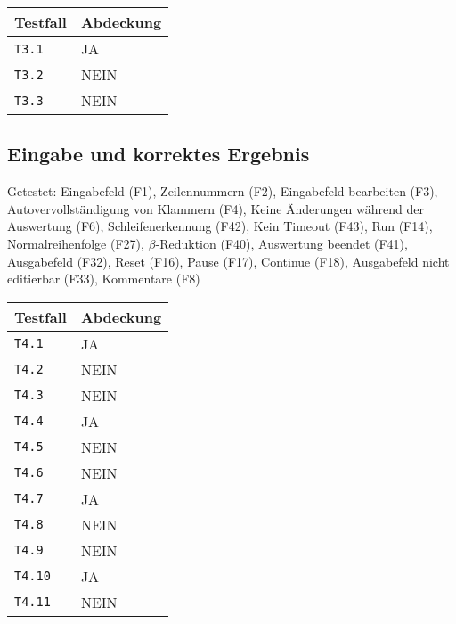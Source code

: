 \documentclass[parskip=full,11pt,twoside]{scrartcl}
\begin{document}
	\label{shortcuts}
	\begin{center}
		\begin{tabular}{ p{9cm} p{4cm}}
    			Testfall & Abdeckung \\ \hline
    			\texttt{T3.1} & \cellcolor{green!20}JA \\ \hline
    			\texttt{T3.2} & \cellcolor{red!20}NEIN \\ \hline
			\texttt{T3.3} & \cellcolor{red!20}NEIN \\ \hline
		\end{tabular}
	\end{center}
	
		\subsection{Eingabe und korrektes Ergebnis}
    Getestet: Eingabefeld (F1), Zeilennummern (F2), Eingabefeld bearbeiten (F3), Autovervollständigung von Klammern (F4), Keine Änderungen während der Auswertung (F6), Schleifenerkennung (F42), Kein Timeout (F43), Run (F14), Normalreihenfolge (F27), $\beta$-Reduktion (F40), Auswertung beendet (F41), Ausgabefeld (F32), Reset (F16), Pause (F17), Continue (F18), Ausgabefeld nicht editierbar (F33), Kommentare (F8)
	\label{shortcuts}
	\begin{center}
		\begin{tabular}{ p{9cm} p{4cm}}
    			Testfall & Abdeckung \\ \hline
    			\texttt{T4.1} & \cellcolor{green!20}JA \\ \hline
    			\texttt{T4.2} & \cellcolor{red!20}NEIN \\ \hline
			\texttt{T4.3} & \cellcolor{red!20}NEIN \\ \hline
			\texttt{T4.4} & \cellcolor{green!20}JA \\ \hline
    			\texttt{T4.5} & \cellcolor{red!20}NEIN \\ \hline
			\texttt{T4.6} & \cellcolor{red!20}NEIN \\ \hline
			\texttt{T4.7} & \cellcolor{green!20}JA \\ \hline
    			\texttt{T4.8} & \cellcolor{red!20}NEIN \\ \hline
			\texttt{T4.9} & \cellcolor{red!20}NEIN \\ \hline
			\texttt{T4.10} & \cellcolor{green!20}JA \\ \hline
    			\texttt{T4.11} & \cellcolor{red!20}NEIN \\ \hline
		\end{tabular}
	\end{center}
\end{document}
